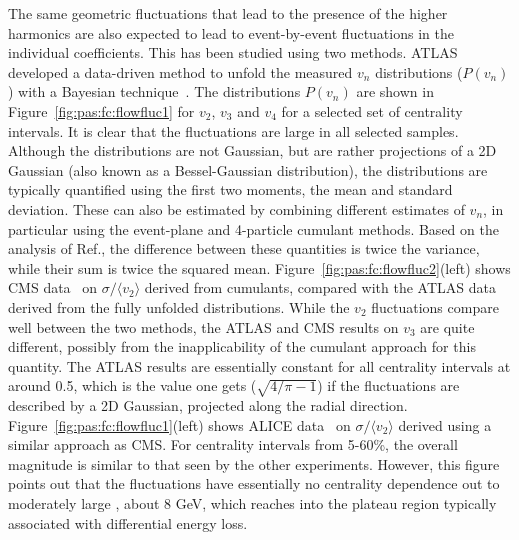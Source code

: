 The same geometric fluctuations that lead to the presence of the higher harmonics are also expected to lead to
event-by-event fluctuations in the individual coefficients.  This has been studied using two methods.
ATLAS developed a data-driven method to unfold the measured $v_n$ distributions ($P(v_n)$) with a Bayesian
technique~\cite{Aad:2013xma}.  The distributions $P(v_n)$ are shown in Figure~\ref{fig:pas:fc:flowfluc1} for $v_2$, $v_3$ and $v_4$
for a selected set of centrality intervals.  It is clear that the fluctuations are large in all selected samples.
Although the distributions are not Gaussian, but are rather projections of a 2D Gaussian (also known as a
Bessel-Gaussian distribution),
the distributions are typically quantified using the first two moments, the mean and standard deviation.
These can also be estimated by combining different estimates of $v_n$, in particular using the event-plane
and 4-particle cumulant methods.  Based on the analysis of Ref.{},
the difference between these quantities is twice the variance, while their sum is twice the squared mean.
Figure~\ref{fig:pas:fc:flowfluc2}(left) shows CMS data~\cite{Chatrchyan:2013kba} on $\sigma/\langle v_2 \rangle$ derived
from cumulants, compared with the ATLAS data derived from the fully unfolded distributions.
While the $v_2$ fluctuations compare well between the two methods, the ATLAS and CMS results on $v_3$
are quite different, possibly from the inapplicability of the cumulant approach for this quantity.
The ATLAS results are essentially constant for all centrality intervals at around 0.5, which is the
value one gets ($\sqrt{4/\pi-1}$) if the fluctuations are described by a 2D Gaussian,
projected along the radial direction.
Figure~\ref{fig:pas:fc:flowfluc1}(left) shows ALICE data~\cite{Abelev:2012di} on $\sigma/\langle v_2 \rangle$ derived
using a similar approach as CMS.  For centrality intervals from 5-60\%, the overall magnitude
is similar to that seen by the other experiments.  However, this figure points out that the fluctuations
have essentially no centrality dependence out to moderately large \pT, about 8 GeV, which reaches into
the plateau region typically associated with differential energy loss.




